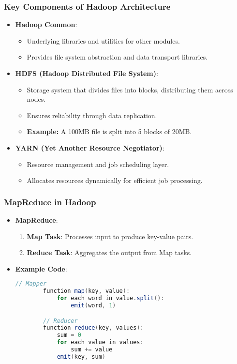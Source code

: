 \documentclass[aspectratio=169]{beamer}
\begin{document}
\begin{frame}[fragile]
    \frametitle{Key Components of Hadoop Architecture}
    \begin{itemize}
        \item \textbf{Hadoop Common}:
        \begin{itemize}
            \item Underlying libraries and utilities for other modules.
            \item Provides file system abstraction and data transport libraries.
        \end{itemize}
        
        \item \textbf{HDFS (Hadoop Distributed File System)}:
        \begin{itemize}
            \item Storage system that divides files into blocks, distributing them across nodes.
            \item Ensures reliability through data replication.
            \item \textbf{Example:} A 100MB file is split into 5 blocks of 20MB.
        \end{itemize}
        
        \item \textbf{YARN (Yet Another Resource Negotiator)}:
        \begin{itemize}
            \item Resource management and job scheduling layer.
            \item Allocates resources dynamically for efficient job processing.
        \end{itemize}
    \end{itemize}
\end{frame}

\begin{frame}[fragile]
    \frametitle{MapReduce in Hadoop}
    \begin{itemize}
        \item \textbf{MapReduce}:
        \begin{enumerate}
            \item \textbf{Map Task}: Processes input to produce key-value pairs.
            \item \textbf{Reduce Task}: Aggregates the output from Map tasks.
        \end{enumerate}
        
        \item \textbf{Example Code}:
        \begin{lstlisting}[language=Java]
        // Mapper
        function map(key, value):
            for each word in value.split():
                emit(word, 1)

        // Reducer
        function reduce(key, values):
            sum = 0
            for each value in values:
                sum += value
            emit(key, sum)
        \end{lstlisting}
    \end{itemize}
\end{frame}
\end{document}
